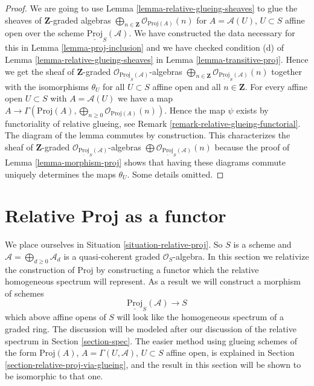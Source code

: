 \begin{proof}
We are going to use Lemma \ref{lemma-relative-glueing-sheaves}
to glue the sheaves of $\mathbf{Z}$-graded algebras
$\bigoplus_{n \in \mathbf{Z}} \mathcal{O}_{\text{Proj}(A)}(n)$
for $A = \mathcal{A}(U)$, $U \subset S$ affine open
over the scheme $\underline{\text{Proj}}_S(\mathcal{A})$.
We have constructed the data necessary for this in
Lemma \ref{lemma-proj-inclusion} and we have checked condition (d) of
Lemma \ref{lemma-relative-glueing-sheaves} in
Lemma \ref{lemma-transitive-proj}. Hence we get the
sheaf of $\mathbf{Z}$-graded
$\mathcal{O}_{\underline{\text{Proj}}_S(\mathcal{A})}$-algebras
$\bigoplus_{n \in \mathbf{Z}}
\mathcal{O}_{\underline{\text{Proj}}_S(\mathcal{A})}(n)$
together with the isomorphisms $\theta_U$ for all
$U \subset S$ affine open and all $n \in \mathbf{Z}$.
For every affine open $U \subset S$ with $A = \mathcal{A}(U)$ we have a map
$A \to \Gamma(\text{Proj}(A),
\bigoplus_{n \geq 0} \mathcal{O}_{\text{Proj}(A)}(n))$.
Hence the map $\psi$ exists by functoriality
of relative glueing, see Remark \ref{remark-relative-glueing-functorial}.
The diagram of the lemma commutes by construction.
This characterizes the sheaf of $\mathbf{Z}$-graded
$\mathcal{O}_{\underline{\text{Proj}}_S(\mathcal{A})}$-algebras 
$\bigoplus \mathcal{O}_{\underline{\text{Proj}}_S(\mathcal{A})}(n)$
because the proof of Lemma \ref{lemma-morphism-proj} shows that
having these diagrams commute uniquely determines the maps $\theta_U$.
Some details omitted.
\end{proof}















\section{Relative Proj as a functor}
\label{section-relative-proj}

\noindent
We place ourselves in Situation \ref{situation-relative-proj}.
So $S$ is a scheme and $\mathcal{A} = \bigoplus_{d \geq 0} \mathcal{A}_d$
is a quasi-coherent graded $\mathcal{O}_S$-algebra.
In this section we relativize the construction of
$\text{Proj}$ by constructing a functor which the relative
homogeneous spectrum will represent.
As a result we will construct a morphism of schemes
$$
\underline{\text{Proj}}_S(\mathcal{A}) \longrightarrow S
$$
which above affine opens of $S$ will look like the homogeneous spectrum
of a graded ring. The discussion will be modeled after our
discussion of the relative spectrum in Section \ref{section-spec}.
The easier method using glueing schemes of the form
$\text{Proj}(A)$, $A = \Gamma(U, \mathcal{A})$, $U \subset S$
affine open, is explained in Section \ref{section-relative-proj-via-glueing},
and the result in this section will be shown to be isomorphic to that one.

